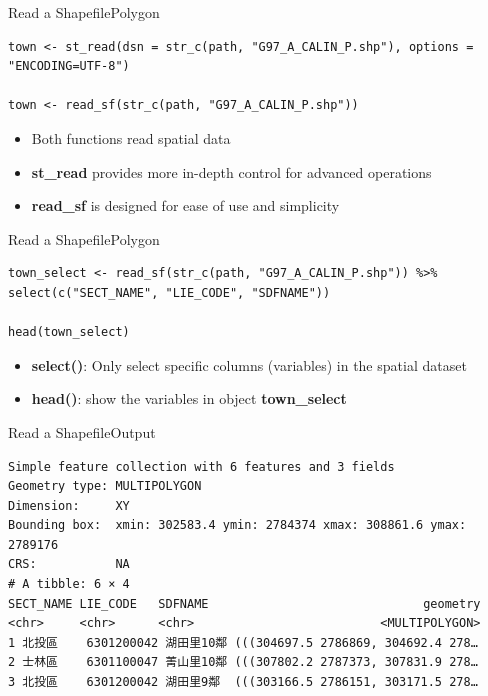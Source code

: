 \documentclass[hyperref={pdfpagelabels=false}]{beamer}
\begin{document}
\begin{frame}[fragile]{Read a Shapefile}{Polygon}

\begin{lstlisting}
town <- st_read(dsn = str_c(path, "G97_A_CALIN_P.shp"), options = "ENCODING=UTF-8")

town <- read_sf(str_c(path, "G97_A_CALIN_P.shp"))
\end{lstlisting}
\begin{itemize}
\item Both functions read spatial data
\vspace{0.2cm}
\item \textbf{st\_read} provides more in-depth control for advanced operations
\vspace{0.2cm}
\item \textbf{read\_sf} is designed for ease of use and simplicity


\end{itemize}

\end{frame}



\begin{frame}[fragile]{Read a Shapefile}{Polygon}
	
\begin{lstlisting}
town_select <- read_sf(str_c(path, "G97_A_CALIN_P.shp")) %>%
select(c("SECT_NAME", "LIE_CODE", "SDFNAME"))

head(town_select) 
\end{lstlisting}
	\begin{itemize}
		\item \textbf{select()}: Only select specific columns (variables) in the spatial dataset
		\vspace{0.2cm}
		\item \textbf{head()}: show the variables in object \textbf{town\_select}
		
	\end{itemize}
	
\end{frame}



\begin{frame}[fragile]{Read a Shapefile}{Output}

\tiny

\begin{lstlisting}
Simple feature collection with 6 features and 3 fields
Geometry type: MULTIPOLYGON
Dimension:     XY
Bounding box:  xmin: 302583.4 ymin: 2784374 xmax: 308861.6 ymax: 2789176
CRS:           NA
# A tibble: 6 × 4
SECT_NAME LIE_CODE   SDFNAME                              geometry
<chr>     <chr>      <chr>                          <MULTIPOLYGON>
1 北投區    6301200042 湖田里10鄰 (((304697.5 2786869, 304692.4 278…
2 士林區    6301100047 菁山里10鄰 (((307802.2 2787373, 307831.9 278…
3 北投區    6301200042 湖田里9鄰  (((303166.5 2786151, 303171.5 278…
\end{lstlisting}

\end{frame}
\end{document}
